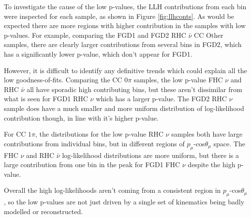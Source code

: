 To investigate the cause of the low p-values, the LLH contributions from each bin were inspected for each sample, as shown in Figure \ref{fig:llhconts}. As would be expected there are more regions with higher contribution in the samples with low p-values. For example, comparing the FGD1 and FGD2 RHC $\bar{\nu}$ CC Other samples, there are clearly larger contributions from several bins in FGD2, which has a significantly lower p-value, which don't appear for FGD1.

However, it is difficult to identify any definitive trends which could explain all the low goodness-of-fits. Comparing the CC 0$\pi$ samples, the low p-value FHC $\nu$ and RHC $\bar{\nu}$ all have sporadic high contributing bins, but these aren't dissimilar from what is seen for FGD1 RHC $\nu$ which has a larger p-value. The FGD2 RHC $\nu$ sample does have a much smaller and more uniform distribution of log-likelihood contribution though, in line with it's higher p-value.

For CC $1\pi$, the distributions for the low p-value RHC $\nu$ samples both have large contributions from individual bins, but in different regions of $p_{\mu}$-cos$\theta_{\mu}$ space. The FHC $\nu$ and RHC $\bar{\nu}$ log-likelihood distributions are more uniform, but there is a large contribution from one bin in the peak for FGD1 FHC $\nu$ despite the high p-value.

Overall the high log-likelihoods aren't coming from a consistent region in $p_{\mu}$-cos$\theta_{\mu}$, so the low p-values are not just driven by a single set of kinematics being badly modelled or reconstructed. 


